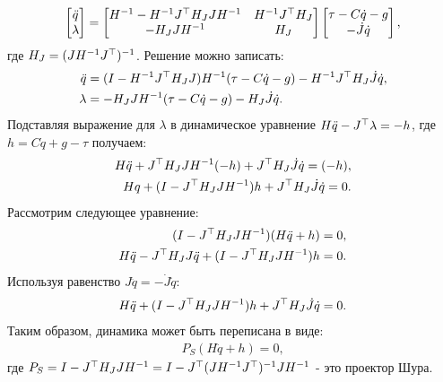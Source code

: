\begin{equation}
	\begin{bmatrix}
		\ddot{{q}} \\
		\lambda
	\end{bmatrix}
	=
	\begin{bmatrix}
		{H}^{-1}-{H}^{-1} {J}^\top {H}_J {J} {H}^{-1} &
		{H}^{-1} {J}^\top {H}_J \\
		-{H}_J {J} {H}^{-1} & {H}_J
	\end{bmatrix}
	\begin{bmatrix}
		\tau - {C} \dot{{q}} - {g} \\
		-\dot{{J}} \dot{{q}}
	\end{bmatrix},
\end{equation}
%
где ${H}_J = ( {J} {H}^{-1} {J}^\top )^{-1}$.
%
Решение можно записать:
%
\begin{align}
	\ddot{{q}}
	&=
	({I}-{H}^{-1} {J}^\top {H}_J {J} ) {H}^{-1}(\tau - {C} \dot{{q}} - {g}) 
	-
	{H}^{-1} {J}^\top {H}_J \dot{{J}} \dot{{q}},
	\\
	\lambda
	&=
	-{H}_J {J} {H}^{-1} (\tau - {C} \dot{{q}} - {g})
	-
	{H}_J \dot{{J}} \dot{{q}}.
\end{align}
%
Подставляя выражение для $\lambda$ в динамическое уравнение ${H}\ddot{{q}} - {J}^\top\lambda
=
-{h}$, где ${h} = {C} \dot{{q}} + {g} - \tau$ получаем:
\begin{align}
	{H}\ddot{{q}} + 
	{J}^\top{H}_J {J} {H}^{-1} (-{h}) +
	{J}^\top {H}_J \dot{{J}} \dot{{q}}
	=
	(-{h}),
	\\
	{{H}{{q}} + 
		({I}-
		{J}^\top{H}_J {J} {H}^{-1}) {h} +
		{J}^\top {H}_J \dot{{J}} \dot{{q}}
		=
		0}.
\end{align}
%
Рассмотрим следующее уравнение:
%
\begin{align}
	({I}-
	{J}^\top{H}_J {J} {H}^{-1})({H}\ddot{{q}}+{h})=0,
	\\
	{H}\ddot{{q}} - {J}^\top{H}_J {J} \ddot{{q}}
	+
	({I}-
	{J}^\top{H}_J {J} {H}^{-1}){h} = 0.
\end{align}
%
Используя равенство ${J} \ddot{{q}} = -\dot{{J}} \dot{{q}}$:
%
\begin{align}{
		{H}\ddot{{q}} + ({I}-{J}^\top{H}_J {J} {H}^{-1}){h} + {J}^\top{H}_J \dot{{J}} \dot{{q}} = 0}.
\end{align}
%
Таким образом, динамика может быть переписана в виде: 
%
\begin{align}
	{P}_S({H}\ddot{{q}}+{h})=0,
\end{align}
%
где ${P}_S = {I}-{J}^\top{H}_J {J} {H}^{-1} = 
{I}-{J}^\top ( {J} {H}^{-1} {J}^\top )^{-1} {J} {H}^{-1}$ - это проектор Шура.


